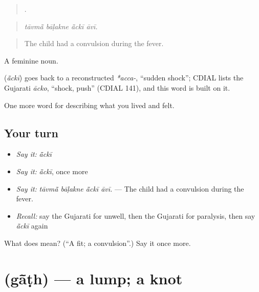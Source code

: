\begin{quote}
   .
\end{quote}

\begin{quote}
\emph{tāvmā̃ bāḷakne ā̃ckī āvī.}
\end{quote}

\begin{quote}
The child had a convulsion during the fever.
\end{quote}

A feminine noun.

\begin{cousinweb}
\textbf{} (\emph{ā̃ckī}) goes back to a reconstructed \emph{*acca-}, \textquotedblleft{}sudden shock\textquotedblright{}; CDIAL lists the Gujarati \emph{ācko}, \textquotedblleft{}shock, push\textquotedblright{} (CDIAL 141), and this word is built on it.
\end{cousinweb}

\begin{grammarlens}[title={What you've built}]
One more word for describing what you lived and felt.
\end{grammarlens}

\subsection*{Your turn}
\begin{itemize}
\raggedright
  \item \emph{Say it:} \emph{ā̃ckī}
  \item \emph{Say it:} \emph{ā̃ckī}, once more
  \item \emph{Say it:} \emph{tāvmā̃ bāḷakne ā̃ckī āvī.} — The child had a convulsion during the fever.
  \item \emph{Recall:} say the Gujarati for unwell, then the Gujarati for paralysis, then say \emph{ā̃ckī} again
\end{itemize}

\begin{tcolorbox}[breakable,colback=teal!4,colframe=teal!35!black,title={Before you move on}]
What does  mean? (\textquotedblleft{}A fit; a convulsion\textquotedblright{}.) Say it once more.
\end{tcolorbox}
\section[\texorpdfstring{\gu{ગાંઠ} (gā̃ṭh)}{ગાંઠ (gā̃ṭh)}]{ (gā̃ṭh) — a lump; a knot}

